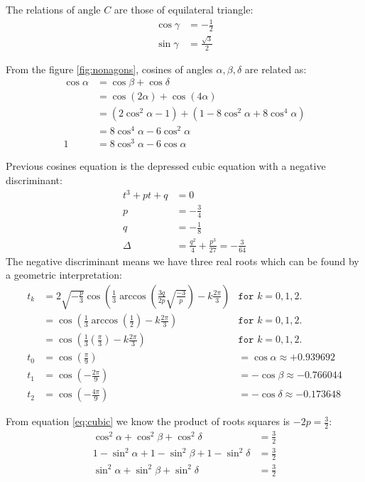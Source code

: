 \documentclass[11pt]{article}
\begin{document}
The relations of angle $C$ are those of equilateral triangle:
\begin{align}
\cos\gamma &= -\frac{1}{2}\\
\sin\gamma &= \frac{\sqrt{3}}{2}
\end{align}

From the figure \ref{fig:nonagons}, cosines of angles $\alpha, \beta, \delta$ are related as:
\begin{align}
\cos\alpha &= \cos\beta + \cos\delta \label{eq:cosines-alpha-beta-delta-sum} \\
 &= \cos(2\alpha) + \cos(4\alpha) \nonumber\\
 &= (2\cos^2\alpha - 1) + (1 -8\cos^2\alpha + 8\cos^4\alpha) \nonumber\\
 &= 8\cos^4\alpha - 6\cos^2\alpha \nonumber\\
 1 &= 8\cos^3\alpha - 6\cos\alpha
\end{align}

Previous cosines equation is the depressed cubic equation with a negative discriminant:
\begin{align}
t^3 +pt +q &= 0 \label{eq:cubic}\\
p &= -\frac{3}{4}\\
q &= -\frac{1}{8}\\
\Delta &= \frac{q^2}{4} + \frac{p^3}{27} = -\frac{3}{64} \nonumber
\end{align}
The negative discriminant means we have three real roots which can be found by a geometric interpretation:
\begin{align}
t_k &= 2\sqrt{-\frac{p}{3}}\cos\left({\frac{1}{3}\arccos\left(
\frac{3q}{2p}\sqrt{\frac{-3}{p}}
\right) -k\frac{2\pi}{3}}\right) &\texttt{for } k=0,1,2. \nonumber\\
&= \cos\left(\frac{1}{3}\arccos\left(\frac{1}{2}\right) -k\frac{2\pi}{3} \right)  &\texttt{for } k=0,1,2. \nonumber\\
&= \cos\left(\frac{1}{3}\left(\frac{\pi}{3}\right) -k\frac{2\pi}{3} \right)  &\texttt{for } k=0,1,2. \nonumber\\
t_0 &= \cos\left(\frac{\pi}{9}\right)   &= \cos\alpha \approx +0.939692\\
t_1 &= \cos\left(-\frac{2\pi}{9}\right) &= -\cos\beta \approx -0.766044 \\
t_2 &= \cos\left(-\frac{4\pi}{9}\right) &= -\cos\delta \approx -0.173648
\end{align}

From equation \ref{eq:cubic} we know the product of roots squares is $-2p = \frac{3}{2}$:
\begin{align}
\cos^2\alpha + \cos^2\beta + \cos^2\delta &= \frac{3}{2} \\
1 - \sin^2\alpha + 1 - \sin^2\beta + 1 - \sin^2\delta &= \frac{3}{2} \nonumber\\
\sin^2\alpha + \sin^2\beta + \sin^2\delta &= \frac{3}{2}
\end{align}
\end{document}
